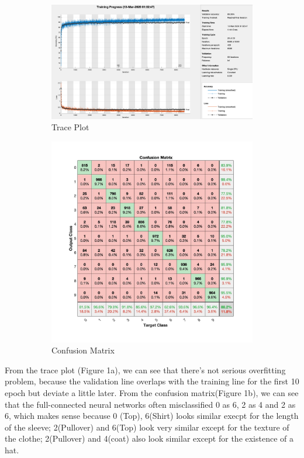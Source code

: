 \documentclass[12pt,letterpaper]{article}
\begin{document}
\begin{figure}[ht]
\begin{subfigure}{.5\textwidth}
  \centering
  \includegraphics[width=1\linewidth]{1-a.png}  
  \caption{Trace Plot}
  \label{fig:sub-first}
\end{subfigure}
\begin{subfigure}{.5\textwidth}
  \centering
  \includegraphics[width=1\linewidth]{1-b.jpg}  
  \caption{Confusion Matrix}
  \label{fig:sub-second}
\end{subfigure}
\label{fig:fig}
\caption{ }
\end{figure}
From the trace plot (Figure 1a), we can see that there's not serious overfitting problem, because the validation line overlaps with the training line for the first 10 epoch but deviate a little later. From the confusion matrix(Figure 1b), we can see that the full-connected neural networks often misclassified 0 as 6, 2 as 4 and 2 as 6, which makes sense because 0 (Top), 6(Shirt) looks similar execpt for the length of the sleeve; 2(Pullover) and 6(Top) look very similar except for the texture of the clothe; 2(Pullover) and 4(coat) also look similar except for the existence of a hat. 
\end{document}
